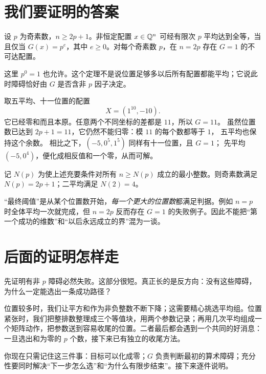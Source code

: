 \section{我们要证明的答案}
\begin{theorem}[素数平均的充要条件]\label{thm:prime}
设 $p$ 为奇素数，$n\ge2p+1$。非恒定配置 $x\in\mathbb Q^n$ 可经有限次 $p$ 平均达到全等，当且仅当 $G(x)=p^e$，其中 $e\ge0$。对每个奇素数 $p$，在 $n=2p$ 存在 $G=1$ 的不可达配置。
\end{theorem}
这里 $p^0=1$ 也允许。这个定理不是说位置足够多以后所有配置都能平均；它说此时障碍恰好由 $G$ 是否含非 $p$ 因子决定。
\begin{example}[如何算判据]
取五平均、十一位置的配置
\[
X=(1^{10},-10).
\]
它已经零和而且本原。任意两个不同坐标的差都是 $11$，所以 $G=11$。
虽然位置数已达到 $2p+1=11$，它仍然不能归零：模 $11$ 的每个数都等于 $1$，
五平均也保持这个余数。
相比之下，$(-5,0^5,1^5)$ 同样有十一位置，且 $G=1$；
先平均 $(-5,0^4)$，便化成相反值和一个零，从而可解。
\end{example}
\begin{corollary}[最优最终阈值]\label{cor:threshold}
记 $N(p)$ 为使上述充要条件对所有 $n\ge N(p)$ 成立的最小整数。则奇素数满足 $N(p)=2p+1$；二平均满足 $N(2)=4$。
\end{corollary}
“最终阈值”是从某个位置数开始，\emph{每一个更大的位置数}都满足判据。例如 $n=p$ 时全体平均一次就完成，但 $n=2p$ 反而存在 $G=1$ 的失败例子。因此不能把“第一个成功的维数”和“以后永远成立的界”混为一谈。

\section{后面的证明怎样走}
先证明有非 $p$ 障碍必然失败。这部分很短。真正长的是反方向：没有这些障碍，为什么一定能选出一条成功路径？

位置较多时，我们让平方和作为非负整数不断下降；这需要精心挑选平均组。位置紧张时，我们把整排数整理成三个等值块，用两个参数记录；再用几次平均组成一个矩阵动作，把参数送到容易收尾的位置。二者最后都会遇到一个共同的好消息：一旦选出和为零的 $p$ 个数，接下来已有独立的收尾方法。

你现在只需记住这三件事：目标可以化成零；$G$ 负责判断最初的算术障碍；充分性要同时解决“下一步怎么选”和“为什么有限步结束”。接下来逐件说明。
